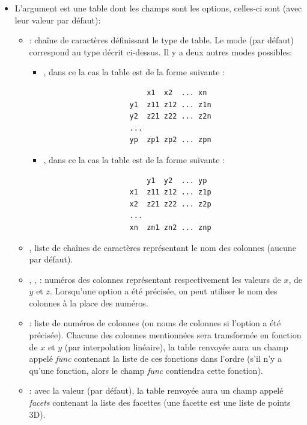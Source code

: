 \begin{itemize}
\item L'argument  est une table dont les champs sont les options, celles-ci sont (avec leur valeur par défaut):
    \begin{itemize}
        \item {} : chaîne de caractères définissant le type de table. Le mode  (par défaut) correspond au type décrit ci-dessus. Il y a deux autres modes possibles:
        \begin{itemize}
            \item {}, dans ce la cas la table est de la forme suivante :
                    \begin{verbatim}
                        x1  x2  ... xn
                    y1  z11 z12 ... z1n
                    y2  z21 z22 ... z2n
                    ...
                    yp  zp1 zp2 ... zpn
                    \end{verbatim}
            \item {}, dans ce la cas la table est de la forme suivante :
                    \begin{verbatim}
                        y1  y2  ... yp
                    x1  z11 z12 ... z1p
                    x2  z21 z22 ... z2p
                    ...
                    xn  zn1 zn2 ... znp
                    \end{verbatim}
        \end{itemize}
    
        \item {}, liste de chaînes de caractères représentant le nom des colonnes (aucune par défaut).

        \item {}, ,  : numéros des colonnes représentant respectivement les valeurs de $x$, de $y$ et $z$. Lorsqu'une option  a été précisée, on peut utiliser le nom des colonnes à la place des numéros.

        \item {} : liste de numéros de colonnes (ou noms de colonnes si l'option  a été précisée). Chacune des colonnes mentionnées sera transformée en fonction de $x$ et $y$ (par interpolation linéaire), la table renvoyée aura un champ appelé \emph{func} contenant la liste de ces fonctions dans l'ordre (s'il n'y a qu'une fonction, alors le champ \emph{func} contiendra cette fonction).
        
        \item {} : avec la valeur \true (par défaut), la table renvoyée aura un champ appelé \emph{facets} contenant la liste des facettes (une facette est une liste de points 3D).
        

\end{itemize}
\end{itemize}
